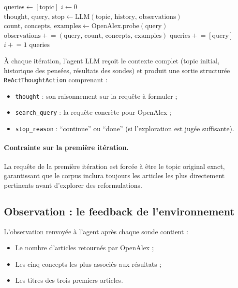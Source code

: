 \begin{algorithm}[htbp]
  \caption{Boucle ReAct du QueryExpander}
  \label{alg:react}
  \begin{algorithmic}[1]
    \State $\text{queries} \gets [\text{topic}]$  
    \State $i \gets 0$
      \State $\text{thought, query, stop} \gets \text{LLM}(\text{topic, history, observations})$
      \State $\text{count, concepts, examples} \gets \text{OpenAlex.probe}(\text{query})$
      \State $\text{observations} \mathrel{+}= (\text{query, count, concepts, examples})$
        \State $\text{queries} \mathrel{+}= [\text{query}]$
      \EndIf
      \State $i \mathrel{+}= 1$
    \EndWhile
    \State \Return $\text{queries}$
  \end{algorithmic}
\end{algorithm}

À chaque itération, l'agent LLM reçoit le contexte complet (topic initial,
historique des pensées, résultats des sondes) et produit une sortie
structurée \texttt{ReActThoughtAction} comprenant :
\begin{itemize}
  \item \texttt{thought} : son raisonnement sur la requête à formuler ;
  \item \texttt{search\_query} : la requête concrète pour OpenAlex ;
  \item \texttt{stop\_reason} : ``continue'' ou ``done'' (si l'exploration
    est jugée suffisante).
\end{itemize}

\paragraph{Contrainte sur la première itération.}
La requête de la première itération est forcée à être le topic original
exact, garantissant que le corpus inclura toujours les articles les plus
directement pertinents avant d'explorer des reformulations.

\subsection{Observation : le feedback de l'environnement}

L'observation renvoyée à l'agent après chaque sonde contient :
\begin{itemize}
  \item Le nombre d'articles retournés par OpenAlex ;
  \item Les cinq concepts les plus associés aux résultats ;
  \item Les titres des trois premiers articles.
\end{itemize}

